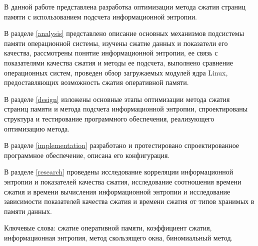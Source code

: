 \begin{essay}{}
    В данной работе представлена разработка оптимизации метода сжатия страниц памяти с использованием подсчета информационной энтропии.

    В разделе \ref{analysis} представлено описание основных механизмов подсистемы памяти операционной системы, изучены сжатие данных и показатели его качества, рассмотрены понятие информационной энтропии, ее связь с показателями качества сжатия и методы ее подсчета, выполнено сравнение операционных систем, проведен обзор загружаемых модулей ядра Linux, предоставляющих возможность сжатия оперативной памяти. 

    В разделе \ref{design} изложены основные этапы оптимизации метода сжатия страниц памяти и метода подсчета информационной энтропии, спроектированы структура и тестирование программного обеспечения, реализующего оптимизацию метода.

    В разделе \ref{implementation} разработано и протестировано спроектированное программное обеспечение, описана его конфигурация.

    В разделе \ref{research} проведены исследование корреляции информационной энтропии и показателей качества сжатия, исследование соотношения времени сжатия и времени вычисления информационной энтропии и исследование зависимости показателей качества сжатия и времени сжатия от типов хранимых в памяти данных.

    Ключевые слова: сжатие оперативной памяти, коэффициент сжатия, информационная энтропия, метод скользящего окна, биномиальный метод.
\end{essay}